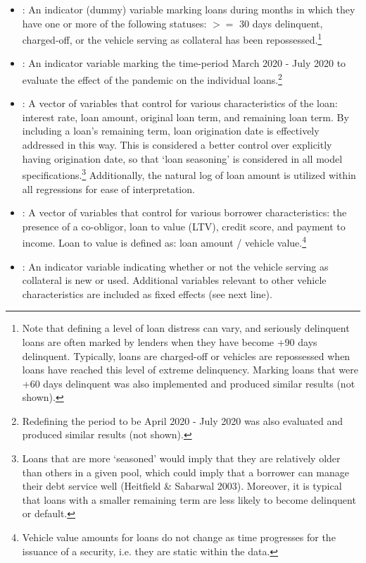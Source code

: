 \documentclass[10.5pt]{article}
\begin{document}
\begin{itemize}[label=$-$, leftmargin=*]
    \item \textbf{}: An indicator (dummy) variable marking loans during months in which they have one or more of the following statuses: $>=$ 30 days delinquent, charged-off, or the vehicle serving as collateral has been repossessed.\footnote{Note that defining a level of loan distress can vary, and seriously delinquent loans are often marked by lenders when they have become +90 days delinquent. Typically, loans are charged-off or vehicles are repossessed when loans have reached this level of extreme delinquency. Marking loans that were +60 days delinquent was also implemented and produced similar results (not shown).} 
    \item \textbf{}: An indicator variable marking the time-period March 2020 - July 2020 to evaluate the effect of the pandemic on the individual loans.\footnote{Redefining the period to be April 2020 - July 2020 was also evaluated and produced similar results (not shown).}
    \item \textbf{}: A vector of variables that control for various characteristics of the loan: interest rate, loan amount, original loan term, and remaining loan term. By including a loan's remaining term, loan origination date is effectively addressed in this way. This is considered a better control over explicitly having origination date, so that `loan seasoning' is considered in all model specifications.\footnote{Loans that are more `seasoned' would imply that they are relatively older than others in a given pool, which could imply that a borrower can manage their debt service well (Heitfield \& Sabarwal 2003). Moreover, it is typical that loans with a smaller remaining term are less likely to become delinquent or default.} Additionally, the natural log of loan amount is utilized within all regressions for ease of interpretation.  
    \item \textbf{}: A vector of variables that control for various borrower characteristics: the presence of a co-obligor, loan to value (LTV), credit score, and payment to income. Loan to value is defined as: loan amount / vehicle value.\footnote{Vehicle value amounts for loans do not change as time progresses for the issuance of a security, i.e. they are static within the data.} 
    \item \textbf{}: An indicator variable indicating whether or not the vehicle serving as collateral is new or used. Additional variables relevant to other vehicle characteristics are included as fixed effects (see next line).

\end{itemize}
\end{document}
